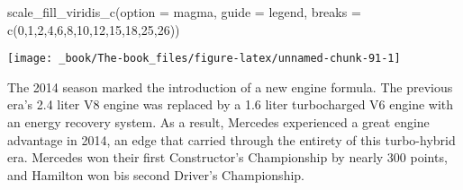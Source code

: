 \documentclass[
]{book}
\newenvironment{Shaded}{\begin{snugshade}}{\end{snugshade}}
\newcommand{\AttributeTok}[1]{\textcolor[rgb]{0.77,0.63,0.00}{#1}}
\newcommand{\DecValTok}[1]{\textcolor[rgb]{0.00,0.00,0.81}{#1}}
\newcommand{\FunctionTok}[1]{\textcolor[rgb]{0.00,0.00,0.00}{#1}}
\newcommand{\NormalTok}[1]{#1}
\newcommand{\StringTok}[1]{\textcolor[rgb]{0.31,0.60,0.02}{#1}}
\begin{document}
\begin{Shaded}
\begin{Highlighting}[]
  \FunctionTok{scale\_fill\_viridis\_c}\NormalTok{(}\AttributeTok{option =} \StringTok{\textquotesingle{}magma\textquotesingle{}}\NormalTok{,}
                       \AttributeTok{guide =} \StringTok{\textquotesingle{}legend\textquotesingle{}}\NormalTok{,}
                       \AttributeTok{breaks =} \FunctionTok{c}\NormalTok{(}\DecValTok{0}\NormalTok{,}\DecValTok{1}\NormalTok{,}\DecValTok{2}\NormalTok{,}\DecValTok{4}\NormalTok{,}\DecValTok{6}\NormalTok{,}\DecValTok{8}\NormalTok{,}\DecValTok{10}\NormalTok{,}\DecValTok{12}\NormalTok{,}\DecValTok{15}\NormalTok{,}\DecValTok{18}\NormalTok{,}\DecValTok{25}\NormalTok{,}\DecValTok{26}\NormalTok{))}
\end{Highlighting}
\end{Shaded}

\begin{center}\texttt{[image: \_book/The-book\_files/figure-latex/unnamed-chunk-91-1]} \end{center}

The 2014 season marked the introduction of a new engine formula. The previous era's 2.4 liter V8 engine was replaced by a 1.6 liter turbocharged V6 engine with an energy recovery system. As a result, Mercedes experienced a great engine advantage in 2014, an edge that carried through the entirety of this turbo-hybrid era. Mercedes won their first Constructor's Championship by nearly 300 points, and Hamilton won bis second Driver's Championship.
\end{document}
